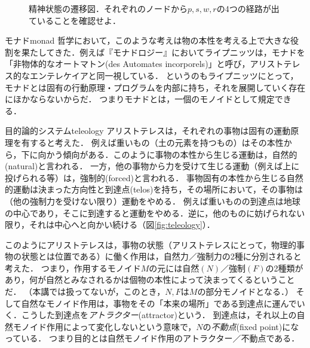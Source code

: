 \documentclass[11pt,a4paper, dvipdfmx]{jsarticle}
\begin{document}
\begin{figure}[t]
    \begin{center}
      \end{center}
      \caption{精神状態の遷移図．それぞれのノードから$p,s,w,r$の4つの経路が出ていることを確認せよ．}
      \label{life_state}
\end{figure}

\begin{rei}{モナド}{monad}
    哲学において，このような考えは物の本性を考える上で大きな役割を果たしてきた．例えば『モナドロジー』においてライプニッツは，モナドを「非物体的なオートマトン(des Automates incorporels)」と呼び，アリストテレス的なエンテレケイアと同一視している．
    というのもライプニッツにとって，モナドとは固有の行動原理・プログラムを内部に持ち，それを展開していく存在にほかならないからだ．
    つまりモナドとは，一個のモノイドとして規定できる．
\end{rei} 


\begin{rei}{目的論的システム}{teleology}
    アリストテレスは，それぞれの事物は固有の運動原理を有すると考えた．
    例えば重いもの（土の元素を持つもの）はその本性から，下に向かう傾向がある．このように事物の本性から生じる運動は，自然的(natural)と言われる．
    一方，他の事物から力を受けて生じる運動（例えば上に投げられる等）は，強制的(forced)と言われる．
    事物固有の本性から生じる自然的運動は決まった方向性と到達点(telos)を持ち，その場所において，その事物は（他の強制力を受けない限り）運動をやめる．
    例えば重いものの到達点は地球の中心であり，そこに到達すると運動をやめる．逆に，他のものに妨げられない限り，それは中心へと向かい続ける（図\ref{fig:teleology}）．
    
    このようにアリストテレスは，事物の状態（アリストテレスにとって，物理的事物の状態とは位置である）に働く作用は，自然力／強制力の2種に分別されると考えた．
    つまり，作用するモノイド$M$の元には自然$(N)$／強制$(F)$の2種類があり，何が自然とみなされるかは個物の本性によって決まってくるということだ．
    （本講では扱ってないが，このとき，$N, F$は$M$の部分モノイドとなる．）
    そして自然なモノイド作用は，事物をその「本来の場所」である到達点に運んでいく．こうした到達点を\emph{アトラクター}(attractor)という．
    到達点は，それ以上の自然モノイド作用によって変化しないという意味で，$N$の\emph{不動点}(fixed point)になっている．
    つまり目的とは自然モノイド作用のアトラクター／不動点である．    
\end{rei}
\end{document}
